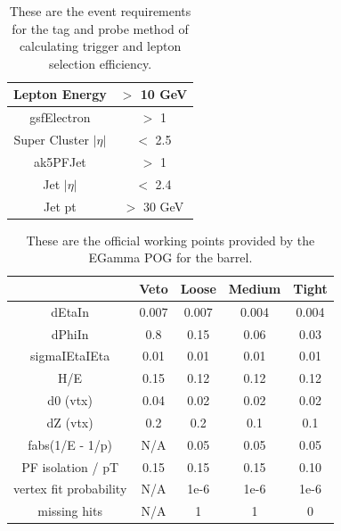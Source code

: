 

\begin{table}[htb]
\caption{%
  These are the event requirements for the tag and probe method of calculating trigger and lepton selection efficiency.
}
\begin{center}
  \begin{tabular}{ | c | c |} \hline
    Lepton Energy & $>$ 10 GeV \\ \hline
    gsfElectron & $>$ 1 \\ \hline
    Super Cluster $|\eta|$ &  $<$ 2.5 \\ \hline
    ak5PFJet  & $>$ 1 \\ \hline
    Jet $|\eta|$ & $<$ 2.4 \\ \hline
    Jet pt & $>$ 30 GeV \\ \hline
  \end{tabular}
\end{center}
\label{tab:tagandprobe_requirements}
\end{table}


\begin{table}[htb]
\caption{%
    These are the official working points provided by the EGamma POG for the barrel.
}
\begin{center}
  \begin{tabular}{ | c | c | c | c | c |} \hline
    & Veto& Loose& Medium& Tight \\ \hline \hline
    dEtaIn	  & 0.007	& 0.007	 &0.004	 &0.004 \\ \hline
    dPhiIn	  &0.8	 & 0.15	& 0.06	& 0.03 \\ \hline
    sigmaIEtaIEta &	 0.01	 &0.01	& 0.01	 &0.01 \\ \hline
    H/E	          &0.15	 &0.12	 &0.12	& 0.12 \\ \hline
    d0 (vtx)	 &0.04	 &0.02	 &0.02	& 0.02 \\ \hline
    dZ (vtx)	 &0.2	 &0.2	 &0.1	& 0.1 \\ \hline
    fabs(1/E - 1/p)	& N/A	 &0.05	& 0.05	 &0.05 \\ \hline
    PF isolation / pT	& 0.15	 &0.15	& 0.15	 &0.10 \\ \hline
    vertex fit probability	& N/A	& 1e-6	 &1e-6	 &1e-6 \\ \hline
    missing hits	 &N/A	 &1	& 1	 &0 \\ \hline
\end{tabular}
\end{center}
\label{tab:electronworkingpoints_barrel}
\end{table}

